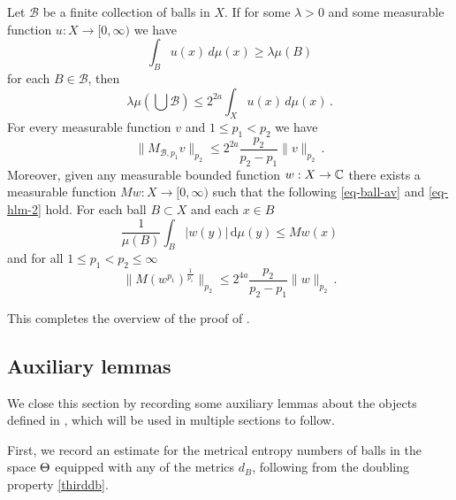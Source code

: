 \begin{proposition}
\label{Hardy-Littlewood}
\leanok
{}
   Let $\mathcal{B}$ be a finite collection of balls in $X$.
If for some $\lambda>0$ and some measurable function $u:X\to [0,\infty)$ we have
\begin{equation}\label{eq-ball-assumption}
\int_{B} u(x)\, d\mu(x)\ge \lambda \mu(B)
\end{equation}
for each $B\in \mathcal{B}$, then
\begin{equation}\label{eq-besico}
    \lambda \mu(\bigcup \mathcal{B}) \le 2^{2a}\int_X u(x)\, d\mu(x)\, .
\end{equation}
For every measurable function $v$
and $1\le p_1<p_2$ we have
\begin{equation}\label{eq-hlm}
    \|M_{\mathcal{B},p_1} v\|_{p_2}\le 2^{2a}\frac{p_2}{p_2-p_1} \|v\|_{p_2}\, .
\end{equation}
Moreover, given any measurable bounded function $w: X \to \mathbb{C}$ there exists a measurable function $Mw: X \to [0, \infty)$ such that the following \eqref{eq-ball-av} and \eqref{eq-hlm-2} hold. For each ball $B \subset X$ and each $x \in B$
\begin{equation}
    \label{eq-ball-av}
    \frac{1}{\mu(B)} \int_{B} |w(y)| \, \mathrm{d}\mu(y) \le Mw(x)
\end{equation}
and for all $1 \le p_1 < p_2 \le \infty$
\begin{equation}
    \label{eq-hlm-2}
    \|M(w^{p_1})^{\frac{1}{p_1}}\|_{p_2} \le 2^{4a} \frac{p_2}{p_2-p_1}\|w\|_{p_2}\,.
\end{equation}

\end{proposition}

This completes the overview of the proof of .

\subsection{Auxiliary lemmas}
\label{global-auxiliary-lemmas}
We close this section by recording some auxiliary lemmas about the objects defined in , which will be used in multiple sections to follow.

First, we record an estimate for the metrical entropy numbers of balls in the space ${\Theta}$ equipped with any of the metrics $d_B$, following from the doubling property \eqref{thirddb}.

